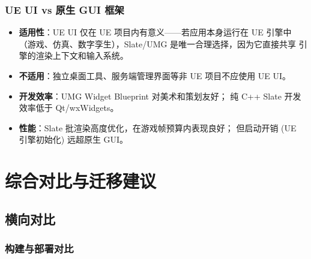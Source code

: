 \documentclass[12pt,a4paper,fontset=fandol]{ctexbook}
\begin{document}
\section{UE UI vs 原生 GUI 框架}

\begin{compare}[title=UE UI 与传统框架对比]
\begin{itemize}
  \item \textbf{适用性}：UE UI 仅在 UE 项目内有意义——若应用本身运行在 UE 引擎中
        （游戏、仿真、数字孪生），Slate/UMG 是唯一合理选择，因为它直接共享
        引擎的渲染上下文和输入系统。
  \item \textbf{不适用}：独立桌面工具、服务端管理界面等非 UE 项目不应使用 UE UI。
  \item \textbf{开发效率}：UMG Widget Blueprint 对美术和策划友好；
        纯 C++ Slate 开发效率低于 Qt/wxWidgets。
  \item \textbf{性能}：Slate 批渲染高度优化，在游戏帧预算内表现良好；
        但启动开销 (UE 引擎初始化) 远超原生 GUI。
\end{itemize}
\end{compare}

\part{综合对比与迁移建议}

\chapter{横向对比}

\section{构建与部署对比}
\end{document}
